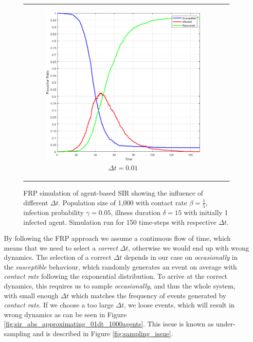 \begin{figure}
\begin{center}
\begin{tabular}{c c}
		\begin{subfigure}[b]{0.4\textwidth}
			\centering
			\includegraphics[width=1\textwidth, angle=0]{./fig/timedriven/SIR_Yampa/SIR_Yampa_dt001.png}
			\caption{$\Delta t = 0.01$}
			\label{fig:sir_abs_approximating_001dt_1000agents}
		\end{subfigure}
	\end{tabular}
	
	\caption{FRP simulation of agent-based SIR showing the influence of different $\Delta t$. Population size of 1,000 with contact rate $\beta = \frac{1}{5}$, infection probability $\gamma = 0.05$, illness duration $\delta = 15$ with initially 1 infected agent. Simulation run for 150 time-steps with respective $\Delta t$.} 
	\label{fig:sir_abs_dynamics_frp}
\end{center}
\end{figure}

By following the FRP approach we assume a continuous flow of time, which means that we need to select a \textit{correct} $\Delta t$, otherwise we would end up with wrong dynamics. The selection of a correct $\Delta t$ depends in our case on \textit{occasionally} in the \textit{susceptible} behaviour, which randomly generates an event on average with \textit{contact rate} following the exponential distribution. To arrive at the correct dynamics, this requires us to sample \textit{occasionally}, and thus the whole system, with small enough $\Delta t$ which matches the frequency of events generated by \textit{contact rate}. If we choose a too large $\Delta t$, we loose events, which will result in wrong dynamics as can be seen in Figure \ref{fig:sir_abs_approximating_01dt_1000agents}. This issue is known as under-sampling and is described in Figure \ref{fig:sampling_issue}.

